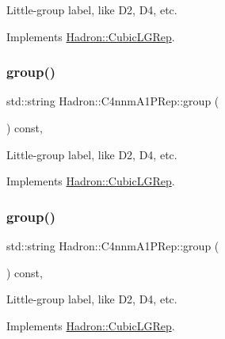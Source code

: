 Little-\/group label, like D2, D4, etc. 

Implements \mbox{\hyperlink{structHadron_1_1CubicLGRep_a9bdb14b519a611d21379ed96a3a9eb41}{Hadron\+::\+Cubic\+L\+G\+Rep}}.

\mbox{\label{structHadron_1_1C4nnmA1PRep_aca4b417019aecb9f64613cca8fb4a152}} 
\subsubsection{\texorpdfstring{group()}{group()}\hspace{0.1cm}{\footnotesize\ttfamily [2/3]}}
{\footnotesize\ttfamily std\+::string Hadron\+::\+C4nnm\+A1\+P\+Rep\+::group (\begin{DoxyParamCaption}{ }\end{DoxyParamCaption}) const\hspace{0.3cm}{\ttfamily [inline]}, {\ttfamily [virtual]}}

Little-\/group label, like D2, D4, etc. 

Implements \mbox{\hyperlink{structHadron_1_1CubicLGRep_a9bdb14b519a611d21379ed96a3a9eb41}{Hadron\+::\+Cubic\+L\+G\+Rep}}.

\mbox{\label{structHadron_1_1C4nnmA1PRep_aca4b417019aecb9f64613cca8fb4a152}} 
\subsubsection{\texorpdfstring{group()}{group()}\hspace{0.1cm}{\footnotesize\ttfamily [3/3]}}
{\footnotesize\ttfamily std\+::string Hadron\+::\+C4nnm\+A1\+P\+Rep\+::group (\begin{DoxyParamCaption}{ }\end{DoxyParamCaption}) const\hspace{0.3cm}{\ttfamily [inline]}, {\ttfamily [virtual]}}

Little-\/group label, like D2, D4, etc. 

Implements \mbox{\hyperlink{structHadron_1_1CubicLGRep_a9bdb14b519a611d21379ed96a3a9eb41}{Hadron\+::\+Cubic\+L\+G\+Rep}}.

\mbox{\label{structHadron_1_1C4nnmA1PRep_a8f1a89bb3b5609a412f723569c90d508}} 
